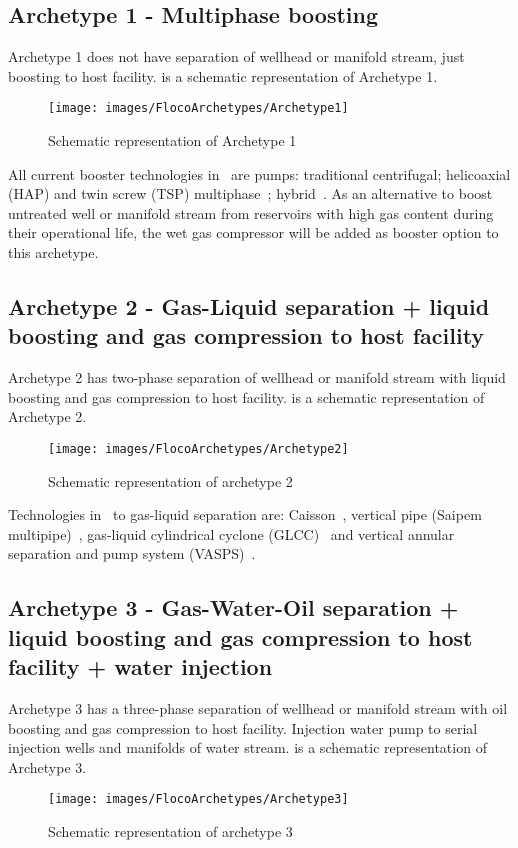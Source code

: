 \subsection{Archetype 1 - Multiphase boosting}
Archetype 1 does not have separation of wellhead or manifold stream, just boosting to host facility.
 is a schematic representation of Archetype 1.
\begin{figure}[H]
\centering
\texttt{[image: images/FlocoArchetypes/Archetype1]}
\caption{Schematic representation of Archetype 1}
\label{fig:Archetype1}
\end{figure}

All current booster technologies in \Floco~are pumps: traditional centrifugal; helicoaxial (HAP) and twin screw (TSP) multiphase~\citep{Hua2012, Solvik2013}; hybrid~\citep{Solvik2013}. As an alternative to boost untreated well or manifold stream from reservoirs with high gas content during their operational life, the wet gas compressor will be added as booster option to this archetype.

\subsection{Archetype 2 - Gas-Liquid separation + liquid boosting and gas compression to host facility}
Archetype 2 has two-phase separation of wellhead or manifold stream with liquid boosting and gas compression to host facility.  is a schematic representation of Archetype 2.
\begin{figure}[H]
\centering
\texttt{[image: images/FlocoArchetypes/Archetype2]}
\caption{Schematic representation of archetype 2}
\label{fig:Archetype2}
\end{figure}

Technologies in \Floco~to gas-liquid separation are: Caisson~\citep{Deuel2011}, vertical pipe (Saipem multipipe)~\citep{Vu2009, Jahnsen2011}, gas-liquid cylindrical cyclone (GLCC)~\citep{Ju2010} and vertical annular separation and pump system (VASPS)~\citep{Baker1991}.

\subsection{Archetype 3 - Gas-Water-Oil separation + liquid boosting and gas compression to host facility + water injection}
 Archetype 3 has a three-phase separation of wellhead or manifold stream with oil boosting and gas compression to host facility. Injection water pump to serial injection wells and manifolds of water stream.  is a schematic representation of Archetype 3.
\begin{figure}[H]
\centering
\texttt{[image: images/FlocoArchetypes/Archetype3]}
\caption{Schematic representation of archetype 3}
\label{fig:Archetype3}
\end{figure}

